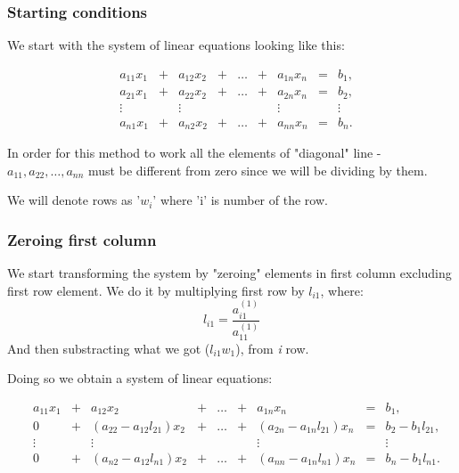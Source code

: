 \documentclass{report}
\begin{document}
\subsubsection{Starting conditions}
We start with the system of linear equations looking like this:

\[
\begin{matrix}

&a_{11}x_1 &{}+&a_{12}x_2&+&\dots&+&a_{1n}x_n &=&b_1,\\

&a_{21}x_1 &{}+&a_{22}x_2&+&\dots&+&a_{2n}x_n &=&b_2,\\

&\vdots    &&\vdots      & &     & &  \vdots  & &\vdots\\

&a_{n1}x_1&{}+&a_{n2}x_2&+&\dots &+&a_{nn}x_n&=&b_n.

\end{matrix}
\]

In order for this method to work all the elements of "diagonal" line - $ a_{11}, a_{22}, \dots, a_{nn} $ must be different from zero since we will be dividing by them.

We will denote rows as '$w_i$' where 'i' is number of the row.

\subsubsection{Zeroing first column}
We start transforming the system by "zeroing" elements in first column excluding first row element. We do it by multiplying first row by $l_{i1}$, where:
\[ l_{i1} = \frac{ a_{i1}^{(1)} }
{ a_{11}^{(1)} }  \]
And then substracting what we got ($ l_{i1}w_1 $), from \textit{i} row.

Doing so we obtain a system of linear equations:

\[
\begin{matrix}

&a_{11}x_1 &{}+&a_{12}x_2&+&\dots&+&a_{1n}x_n &=&b_1,\\

&0 &{}+&(a_{22} - a_{12}l_{21})x_2&{}+&\dots&{}+&(a_{2n} - a_{1n}l_{21})x_n &=&b_2 - b_{1}l_{21},\\

&\vdots    &&\vdots      & &     & &  \vdots  & &\vdots\\

&0&{}+&(a_{n2} - a_{12}l_{n1})x_2&+&\dots &+&(a_{nn} - a_{1n}l_{n1})x_n&=&b_n - b_{1}l_{n1}.

\end{matrix}
\]
\end{document}

